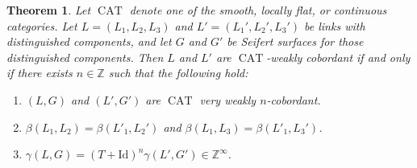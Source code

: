 \documentclass[a4paper, 11pt]{amsart}
\newcommand{\blue}{\textcolor{blue}}
\newcommand{\JP}[1]{[JP] \blue{#1}}
\newcommand{\CAT}{\operatorname{CAT}}
\newtheorem{theorem}{Theorem}[section]
\theoremstyle{definition}
\newcommand{\N}{\mathbb{N}}
\newcommand{\Z}{\mathbb{Z}}
\begin{document}

\begin{theorem}\label{thm:classify}
Let $\CAT$ denote one of the smooth, locally flat, or continuous categories.
Let $L=(L_1,L_2,L_3)$ and $L'=(L_1',L_2',L_3')$ be links with distinguished components, and let $G$ and $G'$ be Seifert surfaces for those distinguished components. Then $L$ and $L'$ are $\CAT$-weakly cobordant if and only if there exists $n\in \Z$ such that the following hold:
\begin{enumerate}
\item \label{item very weak cob}
$(L,G)$ and $(L',G')$ are $\CAT$ very weakly $n$-cobordant.

\item \label{item same beta}
$\beta(L_1,L_2)=\beta(L'_1,L_2')$ and $\beta(L_1,L_3)=\beta(L'_1,L_3')$.

\item \label{item same gamma}
$\gamma(L,G)=(T+\mathrm{Id})^n\gamma(L',G') \in\Z^\infty$.
\end{enumerate}
\end{theorem}



\end{document}
